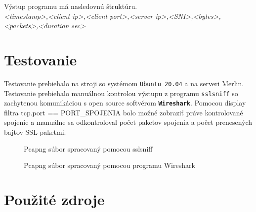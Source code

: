 \documentclass[11pt, a4paper]{article}
\begin{document}
Výstup programu má nasledovnú štruktúru.\\
\emph{<timestamp>,<client ip>,<client port>,<server ip>,<SNI>,<bytes>,<packets>,<duration sec>}


	\newpage
	\section{Testovanie}
	Testovanie prebiehalo na stroji so systémom \texttt{Ubuntu 20.04} a na serveri Merlin. Testovanie prebiehalo manuálnou kontrolou výstupu z programu \texttt{sslsniff} so zachytenou komunikáciou s open source softvérom \texttt{\textbf{Wireshark}}. Pomocou display filtra tcp.port == PORT\_SPOJENIA bolo možné zobraziť práve kontrolované spojenie a manuálne sa odkontroloval počet paketov spojenia a počet prenesených bajtov SSL paketmi. \\
	
	
	\begin{figure}[h]
	\centering
	\caption{Pcapng súbor spracovaný pomocou sslsniff}
	\end{figure}
	\begin{figure}[h]
	\centering
	\caption{Pcapng súbor spracovaný pomocou programu Wireshark}
	
	\end{figure}

	\newpage
	\section{Použité zdroje}
	
	
	\renewcommand{\refname}{Použitá literatúra}
	
	
	
\end{document}
